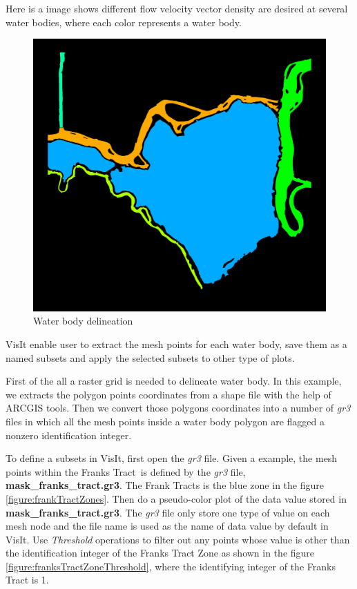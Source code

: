 \documentclass[12pt]{report}
\begin{document}
Here is a image shows different  flow velocity vector density are desired at several water bodies, where each color
represents a water body.
\begin{figure}
\begin{center}
\includegraphics{franksTractZones600}
\caption{Water body delineation }
\label{figure:franksTractZones}
\end{center}
\end{figure} 	

VisIt enable user to extract the mesh points for each water body, save them as a named subsets and apply
the selected subsets to other type of plots. 

First of the all a raster grid is needed  to delineate water body. In
this example, we extracts the polygon points coordinates from a shape file with the help of ARCGIS tools. Then we convert
those polygons coordinates into a number of \emph{gr3} files in which all the mesh points inside a water body polygon are
flagged a nonzero identification integer.

To define a subsets in VisIt, first open the \emph{gr3} file. Given a example, the mesh points within the Franks Tract\
is defined by the \emph{gr3} file, {\bf mask\_franks\_tract.gr3}. The Frank Tracts is the blue zone in the figure \ref {figure:frankTractZones}. Then do a pseudo-color plot of the data value stored in {\bf mask\_franks\_tract.gr3}. The \emph{gr3}
file only store one type of value on each mesh node and the file name is used as the name of data value by default in VisIt.
Use \emph{Threshold} operations to filter out any points whose value is other than the identification integer of the Franks
Tract Zone as shown in the figure \ref{figure:franksTractZoneThreshold}, where the identifying integer of the Franks Tract is
1.
\end{document}
